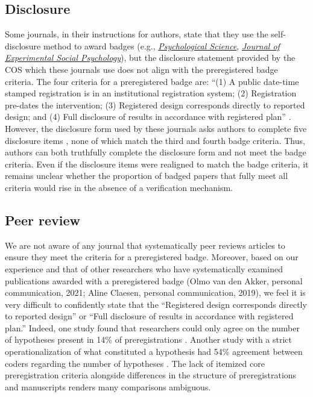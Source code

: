 \documentclass[authordate, meta]{jote-new-article}
\begin{document}
\subsection{Disclosure}

Some journals, in their instructions for authors, state that they use the self-disclosure method to award badges (e.g., \href{https://www.psychologicalscience.org/publications/psychological_science/ps-submissions}{\emph{Psychological Science}}, \href{https://www.elsevier.com/journals/journal-of-experimental-social-psychology/0022-1031/guide-for-authors}{\emph{Journal of Experimental Social Psychology}}), but the disclosure statement provided by the COS which these journals use does not align with the preregistered badge criteria. The four criteria for a preregistered badge are: “(1) A public date-time stamped registration is in an institutional registration system; (2) Registration pre-dates the intervention; (3) Registered design corresponds directly to reported design; and (4) Full disclosure of results in accordance with registered plan” \parencites{COS2023}. However, the disclosure form used by these journals asks authors to complete five disclosure items \parencites{COS2016}, none of which match the third and fourth badge criteria. Thus, authors can both truthfully complete the disclosure form and not meet the badge criteria. Even if the disclosure items were realigned to match the badge criteria, it remains unclear whether the proportion of badged papers that fully meet all criteria would rise in the absence of a verification mechanism.







\subsection{Peer review}

We are not aware of any journal that systematically peer reviews articles to ensure they meet the criteria for a preregistered badge. Moreover, based on our experience \parencites{TARG2022} and that of other researchers who have systematically examined publications awarded with a preregistered badge (Olmo van den Akker, personal communication, 2021; Aline Claesen, personal communication, 2019), we feel it is very difficult to confidently state that the “Registered design corresponds directly to reported design” or “Full disclosure of results in accordance with registered plan.” Indeed, one study found that researchers could only agree on the number of hypotheses present in 14\% of preregistrations \parencites{Bakker2020}. Another study with a strict operationalization of what constituted a hypothesis had 54\% agreement between coders regarding the number of hypotheses \parencites{vandenAkker2022}. The lack of itemized core preregistration criteria alongside differences in the structure of preregistrations and manuscripts renders many comparisons ambiguous.
\end{document}
